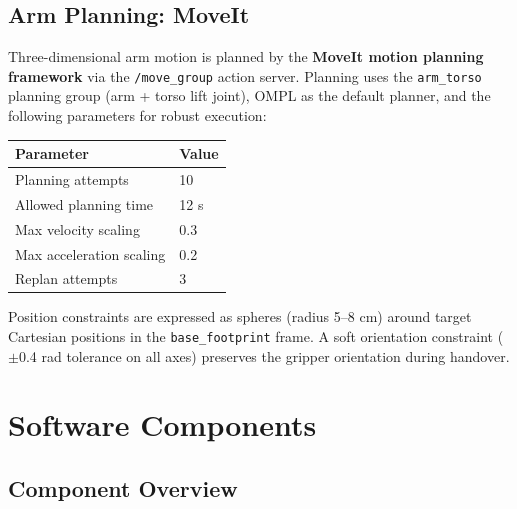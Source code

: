 \documentclass[12pt,a4paper]{report}
\begin{document}
\section{Arm Planning: MoveIt}

Three-dimensional arm motion is planned by the \textbf{MoveIt motion planning framework}
via the \texttt{/move\_group} action server.  Planning uses the \texttt{arm\_torso} planning
group (arm + torso lift joint), OMPL as the default planner, and the following parameters
for robust execution:

\begin{center}
\begin{tabular}{ll}
\toprule
\textbf{Parameter} & \textbf{Value} \\
\midrule
Planning attempts  & 10 \\
Allowed planning time & 12 s \\
Max velocity scaling & 0.3 \\
Max acceleration scaling & 0.2 \\
Replan attempts    & 3 \\
\bottomrule
\end{tabular}
\end{center}

Position constraints are expressed as spheres (radius 5--8 cm) around target Cartesian
positions in the \texttt{base\_footprint} frame.  A soft orientation constraint
($\pm$0.4 rad tolerance on all axes) preserves the gripper orientation during handover.

\chapter{Software Components}

\section{Component Overview}
\end{document}
